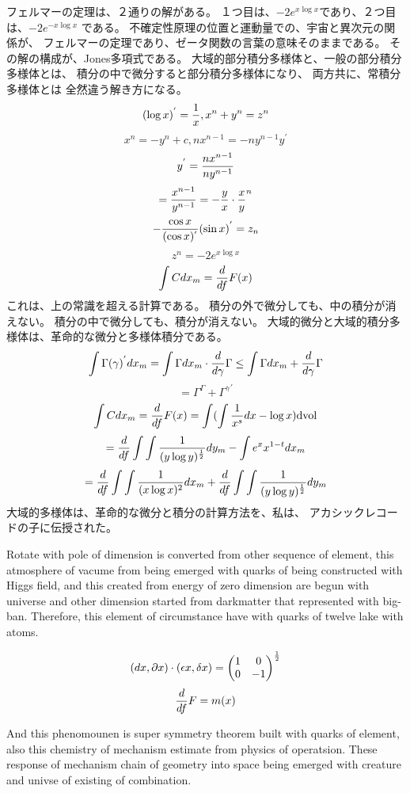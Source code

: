 \documentclass{jsarticle}
\begin{document}
    フェルマーの定理は、２通りの解がある。
    １つ目は、$ -2e^{x \log x} $であり、２つ目は、$ -2 e^{- x \log x} $
    である。
    不確定性原理の位置と運動量での、宇宙と異次元の関係が、
    フェルマーの定理であり、ゼータ関数の言葉の意味そのままである。
    その解の構成が、Jones多項式である。
    大域的部分積分多様体と、一般の部分積分多様体とは、
    積分の中で微分すると部分積分多様体になり、
    両方共に、常積分多様体とは
    全然違う解き方になる。
    $$ (\log x)^{'} = {1 \over x}, x^n+ y^n = z^n $$
    $$ x^n = -y^n + c, nx^{n-1} = -ny^{n-1}y^{'} $$
    $$ y^{'} ={{nx^{n-1}} \over {ny^{n-1}}} $$
    $$ ={x^{n-1} \over y^{n-1}} = - {{y \over x}\cdot{x \over y}^n} $$
    $$ -{{\cos x} \over (\cos x)^{'}}(\sin x)^{'} = z_n $$
    $$ z^n = - 2 e^{x \log x} $$
    $$ \int C dx_m = {d \over df}F(x) $$
    これは、上の常識を超える計算である。
    積分の外で微分しても、中の積分が消えない。
    積分の中で微分しても、積分が消えない。
    大域的微分と大域的積分多様体は、革命的な微分と多様体積分である。
    $$  \int \Gamma(\gamma)^{'}dx_m = \int \Gamma dx_m \cdot {d \over 
    d \gamma}\Gamma \le \int \Gamma dx_m + {d \over d \gamma}\Gamma $$
    $$ = \Gamma^{\Gamma} + {\Gamma^{\gamma}}^{'} $$
    $$  \int C dx_m = {d \over df}F(x) = \int(\int {1 \over x^s}dx - \log x)
    \mathrm{dvol} $$
    $$ = {d \over df}\int \int{1 \over {(y \log y)^{1 \over 2}}}dy_m - 
    \int e^x x^{1 - t}dx_m $$
    $$ = {d \over df}\int\int{1 \over {(x \log x)^2}}dx_m +
    {d \over df}\int\int{1 \over {(y \log y)^{1 \over 2}}}dy_m$$
    大域的多様体は、革命的な微分と積分の計算方法を、私は、
    アカシックレコードの子に伝授された。


 	 Rotate with pole of dimension is converted from other sequence of element,  
this atmosphere of vacume from being emerged with quarks of being constructed
with Higgs field, and this created from energy of zero dimension are begun with
universe and other dimension started from darkmatter that represented with 
big-ban.
Therefore, this element of circumstance have with quarks of twelve lake with
atoms.

  $$ (dx, \partial x)\cdot (\epsilon x, \delta x) = \begin{pmatrix}
	  1 & 0 \\
  0 & - 1 \end{pmatrix}^{1 \over 2}  $$
  $$ {d \over df} F = m(x) $$

 And this phenomounen is super symmetry theorem built with quarks of element, 
also this chemistry of mechanism estimate from physics of operatsion.
These response of mechanism chain of geometry into space being emerged with
creature and univse of existing of combination.
\end{document}

